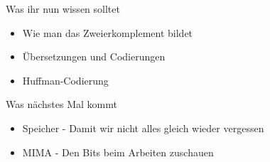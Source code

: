 \begin{frame}	
	\begin{block}{Was ihr nun wissen solltet}
		\begin{itemize}
			\item Wie man das Zweierkomplement bildet
			\item Übersetzungen und Codierungen
			\item Huffman-Codierung
		\end{itemize}
	\end{block}
	
	\begin{block}{Was nächstes Mal kommt}
		\begin{itemize}
			\item Speicher - Damit wir nicht alles gleich wieder vergessen
			\item MIMA - Den Bits beim Arbeiten zuschauen
		\end{itemize}
	\end{block}
\end{frame}

\slideThanks

